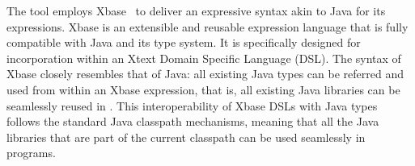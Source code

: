 The tool employs Xbase~\citep{efftinge2012xbase} to deliver an expressive syntax akin to Java for its expressions. Xbase is an extensible and reusable expression language that is fully compatible with Java and its type system. It is specifically designed for incorporation within an Xtext Domain Specific Language (DSL). The syntax of Xbase closely resembles that of Java: all existing Java types can be referred and used from within an Xbase expression, that is, all existing Java libraries can be seamlessly reused in \tool. 
This interoperability of Xbase DSLs with Java types follows the standard Java classpath mechanisms, meaning that all the Java libraries that are part of the current classpath can be used seamlessly in \tool programs. 






